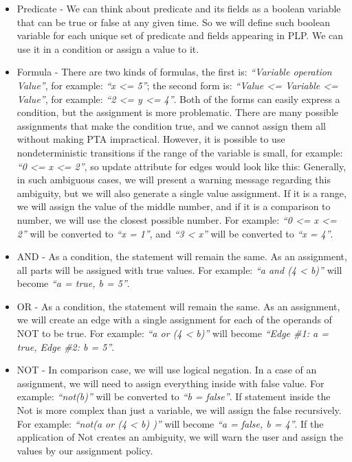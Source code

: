 \begin{itemize}
\item Predicate - We can think about predicate and its fields as a boolean variable that can be true or false at any given time. So we will define such boolean variable for each unique set of predicate and fields appearing in PLP. We can use it in a condition or assign a value to it.
\item Formula - There are two kinds of formulas, the first is: \textit{“Variable operation Value”}, for example: \textit{“x <= 5”}; the second form is: \textit{“Value <= Variable <= Value”}, for example: \textit{“2 <= y <= 4”}. Both of the forms can easily express a condition, but the assignment is more problematic. There are many possible assignments that make the condition true, and we cannot assign them all without making PTA impractical. However, it is possible to use nondeterministic transitions if the range of the variable is small, for example: \textit{“0 <= x <= 2”}, so update attribute for edges would look like this:    Generally, in such ambiguous cases, we will present a warning message regarding this ambiguity, but we will also generate a single value assignment. If it is a range, we will assign the value of the middle number, and if it is a comparison to number, we will use the closest possible number. For example: \textit{“0 <= x <= 2”} will be converted to \textit{“x = 1”}, and \textit{“3 < x”} will be converted to \textit{“x = 4”}.
\item AND - As a condition, the statement will remain the same. As an assignment, all parts will be assigned with true values. For example: \textit{“a and (4 < b)”} will become \textit{“a = true, b = 5”}.
\item OR - As a condition, the statement will remain the same. As an assignment, we will create an edge with a single assignment for each of the operands of NOT to be true. For example: \textit{“a or (4 < b)”} will become \textit{“Edge \#1: a = true, Edge \#2: b = 5”}.
\item NOT - In comparison case, we will use logical negation. In a case of an assignment, we will need to assign everything inside with false value. For example: \textit{“not(b)”} will be converted to \textit{“b = false”}. If statement inside the Not is more complex than just a variable, we will assign the false recursively. For example: \textit{“not(a or (4 < b) )”} will become \textit{“a = false, b = 4”}. If the application of Not creates an ambiguity, we will warn the user and assign the values by our assignment policy.

\end{itemize}
